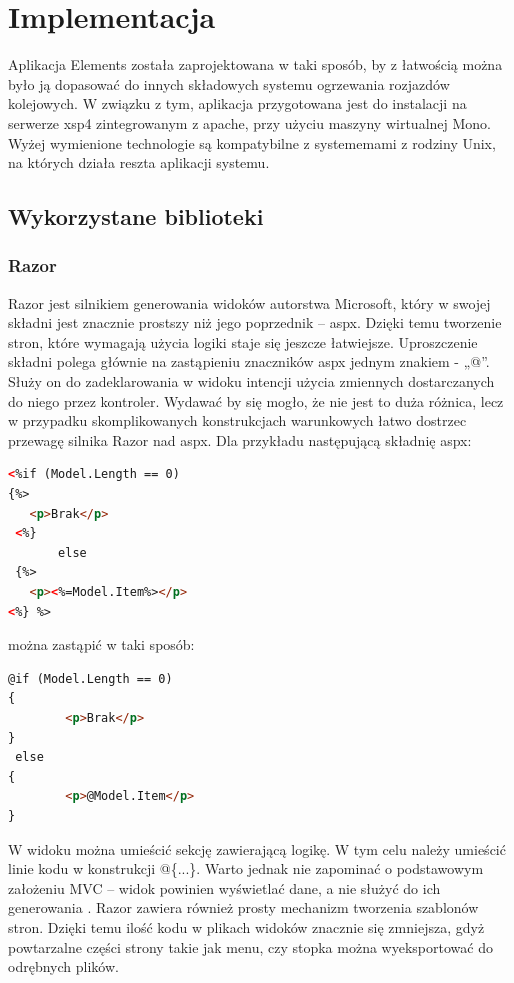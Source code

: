 \chapter{Implementacja}

Aplikacja Elements została zaprojektowana w taki sposób, by z łatwością można było ją dopasować do innych składowych systemu ogrzewania rozjazdów kolejowych. W związku z tym, aplikacja przygotowana jest do instalacji na serwerze xsp4 zintegrowanym z apache, przy użyciu maszyny wirtualnej Mono. Wyżej wymienione technologie są kompatybilne z systememami z rodziny Unix, na których działa reszta aplikacji systemu.

\section{Wykorzystane biblioteki}

\subsection{Razor}

Razor jest silnikiem generowania widoków autorstwa Microsoft, który w swojej składni jest znacznie prostszy niż jego poprzednik – aspx. Dzięki temu tworzenie stron, które wymagają użycia logiki staje się jeszcze łatwiejsze. Uproszczenie składni polega głównie na zastąpieniu znaczników aspx jednym znakiem - „@”. Służy on do zadeklarowania w widoku intencji użycia zmiennych dostarczanych do niego przez kontroler. Wydawać by się mogło, że nie jest to duża różnica, lecz w przypadku skomplikowanych konstrukcjach warunkowych łatwo dostrzec przewagę silnika Razor nad aspx. Dla przykładu następującą składnię aspx:

\begin{lstlisting}[language=HTML]
<%if (Model.Length == 0)
{%>
   <p>Brak</p>
 <%}
       else
 {%>
   <p><%=Model.Item%></p>
<%} %>
\end{lstlisting}
można zastąpić w taki sposób:
\begin{lstlisting}[language=HTML]
@if (Model.Length == 0)
{
        <p>Brak</p>
}
 else
{
        <p>@Model.Item</p>
}
\end{lstlisting}
W widoku można umieścić sekcję zawierającą logikę. W tym celu należy umieścić linie kodu w konstrukcji @\{...\}. Warto jednak nie zapominać o podstawowym założeniu MVC – widok powinien wyświetlać dane, a nie służyć do ich generowania \cite{design-patterns}.
Razor zawiera również prosty mechanizm tworzenia szablonów stron. Dzięki temu ilość kodu w plikach widoków znacznie się zmniejsza, gdyż powtarzalne części strony takie jak menu, czy stopka można wyeksportować do odrębnych plików.

